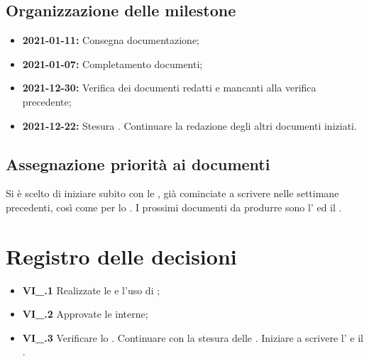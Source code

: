 \subsection{Organizzazione delle milestone}
 \begin{itemize}
  \item \textbf{2021-01-11:} Consegna documentazione;
  \item \textbf{2021-01-07:} Completamento documenti;
  \item \textbf{2021-12-30:} Verifica dei documenti redatti e mancanti alla verifica precedente;
  \item \textbf{2021-12-22:} Stesura \textit{\PdP}. Continuare la redazione degli altri documenti iniziati.
 \end{itemize}

\subsection{Assegnazione priorità ai documenti}
Si è scelto di iniziare subito con le \textit{\NdP}, già cominciate a scrivere nelle settimane precedenti, così come per lo \textit{\SdF}. I prossimi documenti da produrre sono l'\textit{\AdR} ed il \textit{\PdP}. 

\section{Registro delle decisioni}
\begin{itemize}
  \item \textbf{VI\_\Data.1} Realizzate le   e l'uso di ;
  \item \textbf{VI\_\Data.2} Approvate le  interne;
  \item \textbf{VI\_\Data.3} Verificare lo {\SdF}. Continuare con la stesura delle {\NdP}. Iniziare a scrivere l'{\AdR} e il \PdP.
\end{itemize}




